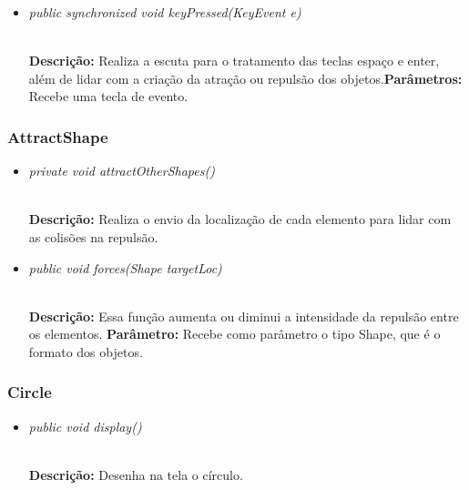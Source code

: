 \documentclass[12pt]{article}
\begin{document}
\vspace{0.2 true cm}

\begin{itemize}
\item \begin{large}\textit{public synchronized void keyPressed(KeyEvent e)}\end{large}\\
\subitem \textbf{Descrição:} Realiza a escuta para o tratamento das teclas espaço e enter, além de lidar com a criação da atração ou repulsão dos objetos.\subitem \textbf{Parâmetros:} Recebe uma tecla de evento.
\end{itemize}

\vspace{0.2 true cm}

\subsubsection{AttractShape}

\begin{itemize}
\item \begin{large}\textit{private void attractOtherShapes()}\end{large}\\
\subitem \textbf{Descrição:} Realiza o envio da localização de cada elemento para lidar com as colisões na repulsão.
\end{itemize}

\vspace{0.2 true cm}

\begin{itemize}
\item \begin{large}\textit{public void forces(Shape targetLoc)}\end{large}\\	
\subitem \textbf{Descrição:} Essa função aumenta ou diminui a intensidade da repulsão entre os elementos.
\subitem \textbf{Parâmetro:} Recebe como parâmetro o tipo Shape, que é o formato dos objetos.
\end{itemize}

\vspace{0.2 true cm}

\subsubsection{Circle}

\begin{itemize}
\item \begin{large}\textit{public void display()}\end{large}\\
\subitem \textbf{Descrição:} Desenha na tela o círculo.
\end{itemize}
\end{document}
